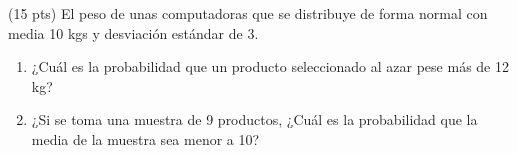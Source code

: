 \documentclass[addpoints]{exam}
\theoremstyle{mytheor}
\begin{document}
\begin{questions}
  \question (15 pts)
  El peso de unas computadoras que se distribuye de forma normal con media 10 kgs y desviación estándar de 3. 
  \begin{enumerate}
  \item ¿Cuál es la probabilidad que un producto seleccionado al azar pese más de 12 kg?
  \item ¿Si se toma una muestra de 9 productos, ¿Cuál es la probabilidad que la media de la muestra sea menor a 10?
  \end{enumerate}

  \end{questions}

  
\end{document}
